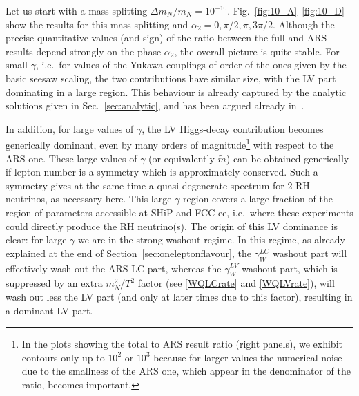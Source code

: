 \documentclass[prd,twocolumn,superscriptaddress,preprintnumbers,nofootinbib,
noshowpacs,groupedaddress]{revtex4-1} %
\begin{document}
Let us start with a mass splitting $\Delta m_N/m_N = 10^{-10}$. Fig.~\ref{fig:10_A}--\ref{fig:10_D} show the results for this mass splitting and $\alpha_2 = 0, \pi/2, \pi, 3\pi/2$. Although the precise quantitative values (and sign) of the ratio between the full and ARS results depend strongly on the phase $\alpha_2$, the overall picture is quite stable. For small $\gamma$, i.e.~for values of the Yukawa couplings of order of the ones given by the basic seesaw scaling, the two contributions have similar size, with the LV part dominating in a large region. This behaviour is already captured by the analytic solutions given in Sec.~\ref{sec:analytic}, and has been argued already in~\cite{Hambye:2016sby}. 

In addition, for large values of $\gamma$, the LV Higgs-decay contribution becomes generically dominant, even by many orders of magnitude\footnote{In the plots showing the total to ARS result ratio (right panels), we exhibit contours only up to $10^2$ or $10^3$ because for larger values the numerical noise due to the smallness of the ARS one, which appear in the denominator of the ratio, becomes important.} with respect to the ARS one. These large values of $\gamma$ (or equivalently $\widetilde m$) can be obtained generically if lepton number is a symmetry which is approximately conserved. Such a symmetry gives at  the same time a quasi-degenerate spectrum for 2 RH neutrinos, as necessary here. This large-$\gamma$ region covers a large fraction of the region of parameters accessible at SHiP and FCC-ee, i.e.~where these experiments could directly produce the RH neutrino(s). The origin of this LV dominance is clear:  for large $\gamma$ we are in the strong washout regime. In this regime, as already explained at the end of Section~\ref{sec:oneleptonflavour},
the $\gamma_W^{LC}$ washout part will effectively wash out the ARS LC part, whereas the $\gamma_W^{LV}$ washout part, which is suppressed by an extra $m_N^2/T^2$ factor (see \eqref{WQLCrate} and \eqref{WQLVrate}), will wash out less the LV part (and only at later times due to this factor), resulting in a dominant LV part.
\end{document}
